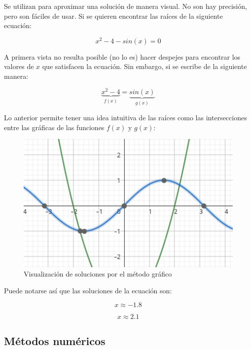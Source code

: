 Se utilizan para aproximar una solución de manera visual. No son hay
precisión, pero son fáciles de usar. Si se quieren encontrar las raíces
de la siguiente ecuación:

\begin{equation}{
        x^2 - 4 - sin(x) = 0
}\end{equation}

A primera vista no resulta posible (no lo es) hacer despejes para
encontrar los valores de \(x\) que satisfacen la ecuación. Sin embargo,
si se escribe de la siguiente manera:

\begin{equation}{
        \underbrace{x^2 - 4}_{f(x)} = \underbrace{sin(x)}_{g(x)}
}\end{equation}

Lo anterior permite tener una idea intuitiva de las raíces como las
intersecciones entre las gráficas de las funciones \(f(x)\) y \(g(x)\):

\begin{figure}[H]
    \centering
    \includegraphics[width=1.0\textwidth]{img/papu.png}
    \caption{Visualización de soluciones por el método gráfico}
\end{figure}

Puede notarse así que las soluciones de la ecuación son:

\begin{equation}{
        x \approx -1.8
}\end{equation}

\begin{equation}{
        x \approx 2.1
}\end{equation}

\subsection{Métodos numéricos}

